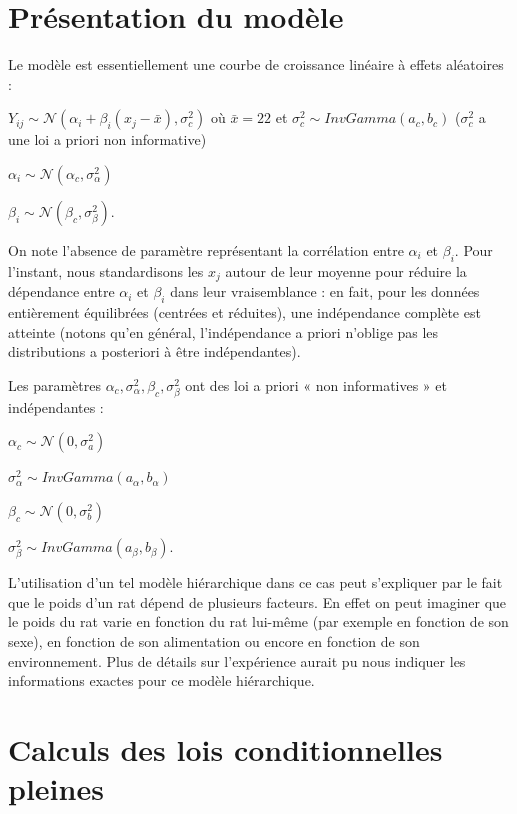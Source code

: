 \documentclass[
]{article}
\begin{document}
\hypertarget{pruxe9sentation-du-moduxe8le}{%
\section{Présentation du modèle}\label{pruxe9sentation-du-moduxe8le}}

Le modèle est essentiellement une courbe de croissance linéaire à effets
aléatoires :

\(Y_{ij} \sim \mathcal N(\alpha_i + \beta_i(x_j - \bar x), \sigma_c ^2)\)
où \(\bar x = 22\) et \(\sigma_c ^2 \sim InvGamma(a_c,b_c)\)
(\(\sigma_c ^2\) a une loi a priori non informative)

\(\alpha_i \sim \mathcal N(\alpha_c,\sigma_{\alpha}^2)\)

\(\beta_i \sim \mathcal N(\beta_c,\sigma_{\beta}^2)\).

On note l'absence de paramètre représentant la corrélation entre
\(\alpha_i\) et \(\beta_i\). Pour l'instant, nous standardisons les
\(x_j\) autour de leur moyenne pour réduire la dépendance entre
\(\alpha_i\) et \(\beta_i\) dans leur vraisemblance : en fait, pour les
données entièrement équilibrées (centrées et réduites), une indépendance
complète est atteinte (notons qu'en général, l'indépendance a priori
n'oblige pas les distributions a posteriori à être indépendantes).

Les paramètres
\(\alpha_c, \sigma_{\alpha}^2, \beta_c, \sigma_{\beta}^2\) ont des loi a
priori « non informatives » et indépendantes :

\(\alpha_c \sim\mathcal N(0,\sigma_a^2)\)

\(\sigma_{\alpha}^2 \sim InvGamma(a_{\alpha},b_{\alpha})\)

\(\beta_c \sim \mathcal N(0,\sigma_b^2)\)

\(\sigma_{\beta}^2 \sim InvGamma(a_{\beta},b_{\beta})\).

L'utilisation d'un tel modèle hiérarchique dans ce cas peut s'expliquer
par le fait que le poids d'un rat dépend de plusieurs facteurs. En effet
on peut imaginer que le poids du rat varie en fonction du rat lui-même
(par exemple en fonction de son sexe), en fonction de son alimentation
ou encore en fonction de son environnement. Plus de détails sur
l'expérience aurait pu nous indiquer les informations exactes pour ce
modèle hiérarchique.

\hypertarget{calculs-des-lois-conditionnelles-pleines}{%
\section{Calculs des lois conditionnelles
pleines}\label{calculs-des-lois-conditionnelles-pleines}}
\end{document}
